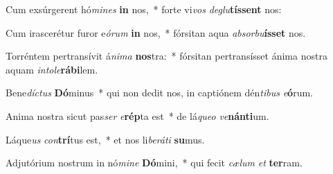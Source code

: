 \item Cum exsúrgerent hó\textit{mi}\textit{nes} \textbf{in} nos,~* forte vi\textit{vos} \textit{de}\textit{glu}\textbf{tís}\textbf{sent} nos:
\item Cum irascerétur furor e\textit{ó}\textit{rum} \textbf{in} nos,~* fórsitan aqua \textit{ab}\textit{sor}\textit{bu}\textbf{ís}\textbf{set} nos.
\item Torréntem pertransívit á\textit{ni}\textit{ma} \textbf{nos}tra:~* fórsitan pertransísset ánima nostra aquam \textit{in}\textit{to}\textit{le}\textbf{rá}\textbf{bi}lem.
\item Bene\textit{díc}\textit{tus} \textbf{Dó}minus~* qui non dedit nos, in captiónem dén\textit{ti}\textit{bus} \textit{e}\textbf{ó}rum.
\item Anima nostra sicut pas\textit{ser} \textit{e}\textbf{rép}ta est~* de lá\textit{que}\textit{o} \textit{ve}\textbf{nán}\textbf{ti}um.
\item Láque\textit{us} \textit{con}\textbf{trí}tus est,~* et nos li\textit{be}\textit{rá}\textit{ti} \textbf{su}mus.
\item Adjutórium nostrum in nó\textit{mi}\textit{ne} \textbf{Dó}mini,~* qui fecit \textit{cæ}\textit{lum} \textit{et} \textbf{ter}ram.
